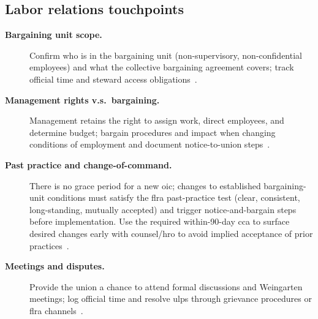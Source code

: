 \documentclass[../main.tex]{subfiles}
\begin{document}
\subsection{Labor relations touchpoints}
\begin{description}
  \item[\textbf{Bargaining unit scope.}] Confirm who is in the bargaining unit (non-supervisory, non-confidential employees) and what the collective bargaining agreement covers; track official time and steward access obligations~\autocite{edo-6-1-5-labor-relations-2025}.
  \item[\textbf{Management rights v.s.\ bargaining.}] Management retains the right to assign work, direct employees, and determine budget; bargain procedures and impact when changing conditions of employment and document notice-to-union steps~\autocite{edo-6-1-5-labor-relations-2025}.
  \item[\textbf{Past practice and change-of-command.}] There is no grace period for a new \ac{oic}; changes to established bargaining-unit conditions must satisfy the \ac{flra} past-practice test (clear, consistent, long-standing, mutually accepted) and trigger notice-and-bargain steps before implementation. Use the required within-90-day \ac{cca} to surface desired changes early with counsel/\ac{hro} to avoid implied acceptance of prior practices~\autocite{FLRA-IRS-3-FLRA-513,OPNAVINST-5354-1H}.
  \item[\textbf{Meetings and disputes.}] Provide the union a chance to attend formal discussions and Weingarten meetings; log official time and resolve \acp{ulp} through grievance procedures or \ac{flra} channels~\autocite{edo-6-1-5-labor-relations-2025}.
\end{description}

\end{document}
